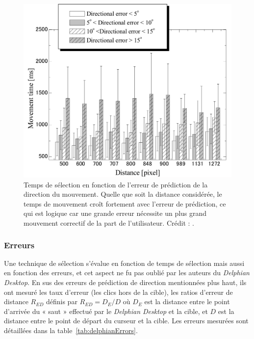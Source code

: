 	\begin{figure}[H]
		\centering
		\includegraphics[width=\textwidth]{figures/ch2/delphianTimesErrors}
		\caption[\emph{Delphian Desktop} --- temps de sélection en fonction de l'erreur de prédiction]{Temps de sélection en fonction de l'erreur de prédiction de la direction du mouvement. Quelle que soit la distance considérée, le temps de mouvement croît fortement avec l'erreur de prédiction, ce qui est logique car une grande erreur nécessite un plus grand mouvement correctif de la part de l'utilisateur. Crédit : \cite{asano2005predictive}.}
		\label{fig:delphianTimesErrors}
	\end{figure}
	
	\subsubsection{Erreurs}
	Une technique de sélection s'évalue en fonction de temps de sélection mais aussi en fonction des erreurs, et cet aspect ne fu pas oublié par les auteurs du \emph{Delphian Desktop}. En sus des erreurs de prédiction de direction mentionnées plus haut, ils ont mesuré les taux d'erreur (les clics hors de la cible), les ratios d'erreur de distance $R_{ED}$ définis par $R_{ED} = D_{E}/D$ où $D_{E}$ est la distance entre le point d'arrivée du « saut » effectué par le \emph{Delphian Desktop} et la cible, et $D$ est la distance entre le point de départ du curseur et la cible. Les erreurs mesurées sont détaillées dans la table~\ref{tab:delphianErrors}.
	
